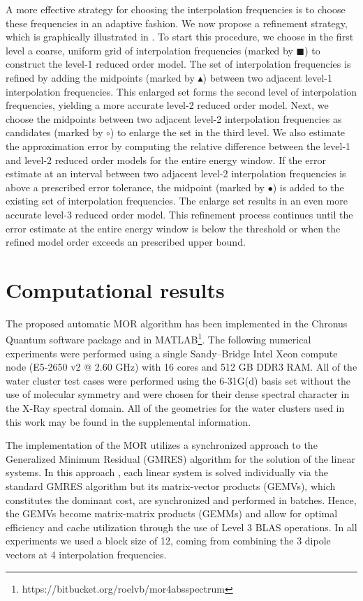 A more effective strategy for choosing the interpolation frequencies is to choose these frequencies in an adaptive fashion. We now propose a refinement strategy, which is graphically illustrated in . To start this procedure, we choose in the first level a coarse, uniform grid of interpolation frequencies (marked by {\scriptsize$\blacksquare$}) to construct the level-1 reduced order model. The set of interpolation frequencies is refined by adding the midpoints (marked by {\footnotesize$\blacktriangle$}) between two adjacent level-1 interpolation frequencies. This enlarged set forms the second level of interpolation frequencies, yielding a more accurate level-2 reduced order model. Next, we choose the midpoints between two adjacent level-2 interpolation frequencies as candidates (marked by $\circ$) to enlarge the set in the third level. We also estimate the approximation error by computing the relative difference between the level-1 and level-2 reduced order models for the entire energy window. If the error estimate at an interval between two adjacent level-2 interpolation frequencies is above a prescribed error tolerance, the midpoint (marked by $\bullet$) is added to the existing set of interpolation frequencies. The enlarge set results in an even more accurate level-3 reduced order model. This refinement process continues until the error estimate at the entire energy window is below the threshold or when the refined model order exceeds an prescribed upper bound.

\section{Computational results}
\label{sec:MORresults}

The proposed automatic MOR algorithm has been implemented in the Chronus
Quantum software package \cite{chronusq_beta2} and in
MATLAB\footnote[4]{https://bitbucket.org/roelvb/mor4absspectrum}.
The following numerical experiments were performed using a single
Sandy--Bridge Intel Xeon compute node (E5-2650 v2 @ 2.60 GHz) with 16
cores and 512 GB DDR3 RAM. All of the water cluster test cases were performed
using the 6-31G(d) basis set without the use of molecular symmetry and
were chosen for their dense spectral character in the X-Ray spectral domain.
All of the geometries for the water clusters used in this work may be
found in the supplemental information.

The implementation of the MOR utilizes a synchronized approach to the
Generalized Minimum Residual (GMRES) \cite{Walker88_152} algorithm for the
solution of the linear systems. In this approach \cite{shak2016}, each linear
system is solved individually via the standard GMRES algorithm but its
matrix-vector products (GEMVs), which constitutes the dominant cost, are synchronized
and performed in batches. Hence, the GEMVs become matrix-matrix
products (GEMMs) and allow for optimal efficiency and cache utilization through
the use of Level 3 BLAS operations. In all experiments we used a block size of
12, coming from combining the 3 dipole vectors at 4 interpolation frequencies.

